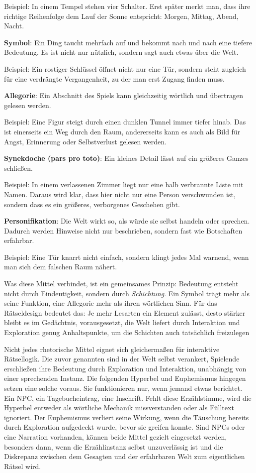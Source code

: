\documentclass[parskip=half,a4paper,11pt]{scrreprt}
\begin{document}
Beispiel: In einem Tempel stehen vier Schalter. Erst später merkt man, dass ihre richtige Reihenfolge dem Lauf der Sonne entspricht: Morgen, Mittag, Abend, Nacht.

\textbf{Symbol}: Ein Ding taucht mehrfach auf und bekommt nach und nach eine tiefere Bedeutung. 
Es ist nicht nur nützlich, sondern sagt auch etwas über die Welt. 

Beispiel: Ein rostiger Schlüssel öffnet nicht nur eine Tür, sondern steht zugleich für eine verdrängte Vergangenheit, zu der man erst Zugang finden muss.

\textbf{Allegorie}: Ein Abschnitt des Spiels kann gleichzeitig wörtlich und übertragen gelesen werden. 

Beispiel: Eine Figur steigt durch einen dunklen Tunnel immer tiefer hinab. Das ist einerseits ein Weg durch den Raum, andererseits kann es auch als Bild für Angst, Erinnerung oder Selbstverlust gelesen werden.

\textbf{Synekdoche (pars pro toto)}: Ein kleines Detail lässt auf ein größeres Ganzes schließen. 

Beispiel: In einem verlassenen Zimmer liegt nur eine halb verbrannte Liste mit Namen. Daraus wird klar, dass hier nicht nur eine Person verschwunden ist, sondern dass es ein größeres, verborgenes Geschehen gibt.

\textbf{Personifikation}: Die Welt wirkt so, als würde sie selbst handeln oder sprechen. Dadurch werden Hinweise nicht nur beschrieben, sondern fast wie Botschaften erfahrbar. 

Beispiel: Eine Tür knarrt nicht einfach, sondern klingt jedes Mal warnend, wenn man sich dem falschen Raum nähert.

Was diese Mittel verbindet, ist ein gemeinsames Prinzip: Bedeutung entsteht nicht durch Eindeutigkeit, sondern durch \textit{Schichtung}. Ein Symbol trägt mehr als seine Funktion, eine Allegorie mehr als ihren wörtlichen Sinn. Für das Rätseldesign bedeutet das: Je mehr Lesarten ein Element zulässt, desto stärker bleibt es im Gedächtnis, vorausgesetzt, die Welt liefert durch Interaktion und Exploration genug Anhaltspunkte, um die Schichten auch tatsächlich freizulegen

Nicht jedes rhetorische Mittel eignet sich gleichermaßen für interaktive Rätsellogik. Die zuvor genannten sind in der Welt selbst verankert, Spielende erschließen ihre Bedeutung durch Exploration und Interaktion, unabhängig von einer sprechenden Instanz. Die folgenden Hyperbel und Euphemismus hingegen setzen eine solche voraus. Sie funktionieren nur, wenn jemand etwas berichtet. Ein NPC, ein Tagebucheintrag, eine Inschrift. Fehlt diese Erzählstimme, wird die Hyperbel entweder als wörtliche Mechanik missverstanden oder als Fülltext ignoriert. Der Euphemismus verliert seine Wirkung, wenn die Täuschung bereits durch Exploration aufgedeckt wurde, bevor sie greifen konnte. Sind NPCs oder eine Narration vorhanden, können beide Mittel gezielt eingesetzt werden, besonders dann, wenn die Erzählinstanz selbst unzuverlässig ist und die Diskrepanz zwischen dem Gesagten und der erfahrbaren Welt zum eigentlichen Rätsel wird.
\end{document}
